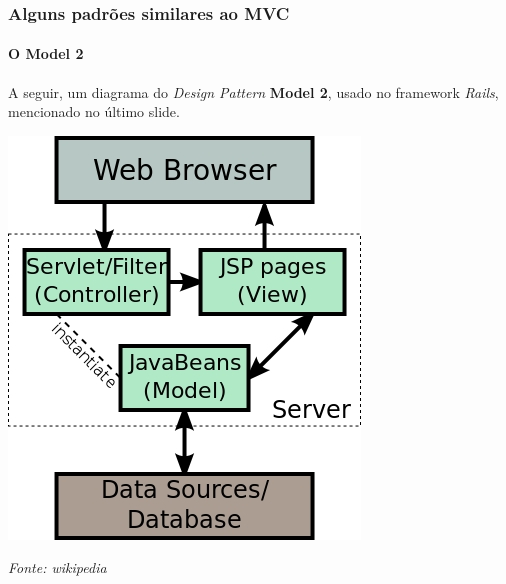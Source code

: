 \documentclass{beamer}
\begin{document}
\begin{frame}
\frametitle{Alguns padrões similares ao MVC}
\framesubtitle{O Model 2}
	A seguir, um diagrama do \textit{Design Pattern} \textbf{Model 2}, usado no framework \textit{Rails}, mencionado no último slide.\\
	\begin{center}
		\includegraphics[scale=0.2]{Model2.jpg}
	\end{center}
	\begin{center}
		\tiny{\textit{Fonte: wikipedia}}
	\end{center} 
\end{frame}
\end{document}
